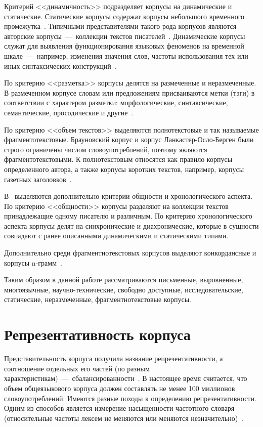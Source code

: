 Критерий <<динамичность>> подразделяет корпусы на динамические и статические. Статические корпусы содержат корпусы небольшого временного промежутка~\cite{Zubov}. Типичными представителями такого рода корпусов являются авторские корпусы~---~коллекции текстов писателей~\cite{Zaharov}. Динамические корпусы служат для выявления функционирования языковых феноменов на временной шкале~---~например, изменения значения слов, частоты использования тех или иных синтаксических конструкций~\cite{Baranov}.

По критерию <<разметка>> корпусы делятся на размеченные и неразмеченные. В размеченном корпусе словам или предложениям присваиваются метки (тэги) в соответствии с характером разметки: морфологические, синтаксические, семантические, просодические и другие~\cite{Zaharov}.

По критерию <<объем текстов>> выделяются полнотекстовые и так называемые фрагментотекстовые. Брауновский корпус и корпус Ланкастер-Осло-Берген были строго ограничены числом словоупотреблений, поэтому являются фрагментотекстовыми. К полнотекстовым относятся как правило корпусы определенного автора, а также корпусы коротких текстов, например, корпусы газетных заголовков~\cite{Zaharov}.

В~\cite{Grudeva} выделяются дополнительно критерии общности и хронологического аспекта. По критерию <<общности>> корпусы разделяют на коллекции текстов принадлежащие одному писателю и различным. По критерию хронологического аспекта корпусы делят на синхронические и диахронические, которые в сущности совпадают с ранее описанными динамическими и статическими типами.

Дополнительно среди фрагментнотекстовых корпусов выделяют конкордансные и корпусы n-грамм~\cite{Kopotev}.

Таким образом в данной работе рассматриваются письменные, выровненные, многоязычные, научно-технические, свободно доступные, исследовательские, статические, неразмеченные, фрагментнотекстовые корпусы.

\section{Репрезентативность корпуса}

Представительность корпуса получила название репрезентативности, а соотношение отдельных его частей (по разным характеристикам)~---~сбалансированности~\cite{ZaharovSpec}. В настоящее время считается, что объем общеязыкового корпуса должен составлять не менее 100 миллионов словоупотреблений. Имеются разные походы к определению репрезентативности. Одним из способов является измерение насыщенности частотного словаря (относительные частоты лексем не меняются или меняются незначительно)~\cite{Zaharov}.

